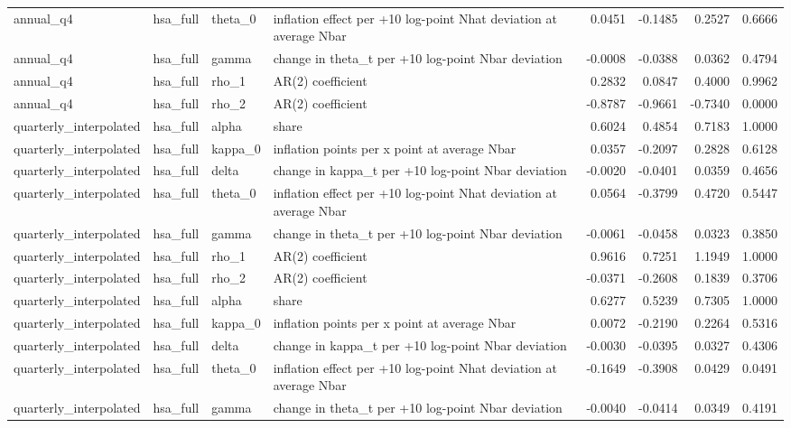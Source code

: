 \begin{tabular}{llllrrrr}
annual\_q4 & hsa\_full & theta\_0 & inflation effect per +10 log-point Nhat deviation at average Nbar & 0.0451 & -0.1485 & 0.2527 & 0.6666 \\
annual\_q4 & hsa\_full & gamma & change in theta\_t per +10 log-point Nbar deviation & -0.0008 & -0.0388 & 0.0362 & 0.4794 \\
annual\_q4 & hsa\_full & rho\_1 & AR(2) coefficient & 0.2832 & 0.0847 & 0.4000 & 0.9962 \\
annual\_q4 & hsa\_full & rho\_2 & AR(2) coefficient & -0.8787 & -0.9661 & -0.7340 & 0.0000 \\
quarterly\_interpolated & hsa\_full & alpha & share & 0.6024 & 0.4854 & 0.7183 & 1.0000 \\
quarterly\_interpolated & hsa\_full & kappa\_0 & inflation points per x point at average Nbar & 0.0357 & -0.2097 & 0.2828 & 0.6128 \\
quarterly\_interpolated & hsa\_full & delta & change in kappa\_t per +10 log-point Nbar deviation & -0.0020 & -0.0401 & 0.0359 & 0.4656 \\
quarterly\_interpolated & hsa\_full & theta\_0 & inflation effect per +10 log-point Nhat deviation at average Nbar & 0.0564 & -0.3799 & 0.4720 & 0.5447 \\
quarterly\_interpolated & hsa\_full & gamma & change in theta\_t per +10 log-point Nbar deviation & -0.0061 & -0.0458 & 0.0323 & 0.3850 \\
quarterly\_interpolated & hsa\_full & rho\_1 & AR(2) coefficient & 0.9616 & 0.7251 & 1.1949 & 1.0000 \\
quarterly\_interpolated & hsa\_full & rho\_2 & AR(2) coefficient & -0.0371 & -0.2608 & 0.1839 & 0.3706 \\
quarterly\_interpolated & hsa\_full & alpha & share & 0.6277 & 0.5239 & 0.7305 & 1.0000 \\
quarterly\_interpolated & hsa\_full & kappa\_0 & inflation points per x point at average Nbar & 0.0072 & -0.2190 & 0.2264 & 0.5316 \\
quarterly\_interpolated & hsa\_full & delta & change in kappa\_t per +10 log-point Nbar deviation & -0.0030 & -0.0395 & 0.0327 & 0.4306 \\
quarterly\_interpolated & hsa\_full & theta\_0 & inflation effect per +10 log-point Nhat deviation at average Nbar & -0.1649 & -0.3908 & 0.0429 & 0.0491 \\
quarterly\_interpolated & hsa\_full & gamma & change in theta\_t per +10 log-point Nbar deviation & -0.0040 & -0.0414 & 0.0349 & 0.4191 \\

\end{tabular}
